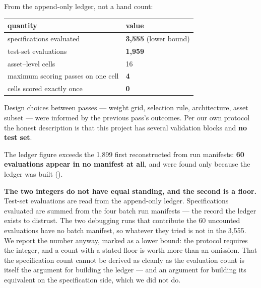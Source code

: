 From the append-only ledger, not a hand count:

{\def\LTcaptype{none} %
\begin{longtable}[]{@{}ll@{}}
\toprule\noalign{}
quantity & value \\
\midrule\noalign{}
\endhead
\bottomrule\noalign{}
\endlastfoot
specifications evaluated & \textbf{3,555} (lower bound) \\
test-set evaluations & \textbf{1,959} \\
asset--level cells & 16 \\
maximum scoring passes on one cell & \textbf{4} \\
cells scored exactly once & \textbf{0} \\
\end{longtable}
}

Design choices between passes --- weight grid, selection rule, architecture, asset subset --- were
informed by the previous pass's outcomes. Per our own protocol the honest description is that
this project has several validation blocks and \textbf{no test set}.

The ledger figure exceeds the 1,899 first reconstructed from run manifests: \textbf{60 evaluations
appear in no manifest at all}, and were found only because the ledger was built ().

\textbf{The two integers do not have equal standing, and the second is a floor.} Test-set
evaluations are read from the append-only ledger. Specifications evaluated are summed from the
four batch run manifests --- the record the ledger exists to distrust. The two debugging runs
that contribute the 60 uncounted evaluations have no batch manifest, so whatever they tried is
not in the 3,555. We report the number anyway, marked as a lower bound: the protocol requires
the integer, and a count with a stated floor is worth more than an omission. That the
specification count cannot be derived as cleanly as the evaluation count is itself the
argument for building the ledger --- and an argument for building its equivalent on the
specification side, which we did not do.
